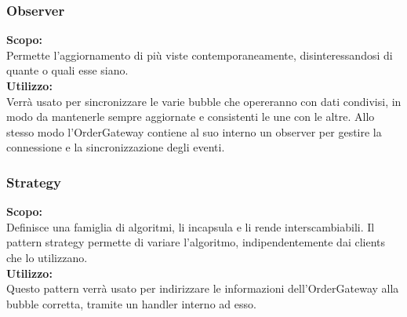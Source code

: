 \subsubsection{Observer}
\textbf{Scopo:} \\
Permette l'aggiornamento di più viste contemporaneamente, disinteressandosi di quante o quali esse siano.\\
\textbf{Utilizzo:} \\
Verrà usato per sincronizzare le varie bubble che opereranno con dati condivisi, in modo da mantenerle sempre aggiornate e consistenti le une con le altre. Allo stesso modo l'OrderGateway contiene al suo interno un observer per gestire la connessione e la sincronizzazione degli eventi.

\subsubsection{Strategy}
\textbf{Scopo:} \\
Definisce una famiglia di algoritmi, li incapsula e li rende interscambiabili. Il pattern strategy permette di variare l'algoritmo, indipendentemente dai clients che lo utilizzano.\\
\textbf{Utilizzo:} \\
Questo pattern verrà usato per indirizzare le informazioni dell'OrderGateway alla bubble corretta, tramite un handler interno ad esso.
